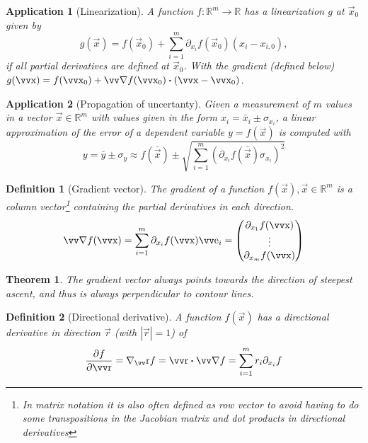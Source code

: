 \documentclass[twocolumn, margin=small]{tex/hsrzf}
\theoremstyle{fuvarzf}
\newtheorem{theorem}{Theorem}
\newtheorem{application}{Application}
\newtheorem{definition}{Definition}
\begin{document}
\begin{application}[Linearization]
  A function \(f: \mathbb{R}^m\to\mathbb{R}\) has a linearization \(g\) at
  \(\vec{x}_0\) given by
  \[
    g(\vec{x}) = f(\vec{x}_0) 
      + \sum_{i=1}^m \partial_{x_i} f(\vec{x}_0)(x_i - x_{i,0}) ,
  \]
  if all partial derivatives are defined at \(\vec{x}_0\). With the gradient
  (defined below) \(g(\vec{x}) = f(\vec{x}_0) + \grad f(\vec{x}_0) \dotp
  (\vec{x} - \vec{x}_0)\).
\end{application}

\begin{application}[Propagation of uncertanty]
  Given a measurement of \(m\) values in a vector \(\vec{x}\in\mathbb{R}^m\)
  with values given in the form \(x_i = \bar{x}_i \pm \sigma_{x_i}\), a linear
  approximation of the error of a dependent variable \(y = f(\vec{x})\) is
  computed with
  \[
    y = \bar{y} \pm \sigma_y \approx f(\bar{\vec{x}})
      \pm \sqrt{\sum_{i=1}^m \left(
        \partial_{x_i} f(\bar{\vec{x}}) \sigma_{x_i}\right)^2}
  \]
\end{application}

\begin{definition}[Gradient vector]
  The \emph{gradient} of a function \(f(\vec{x}), \vec{x}\in\mathbb{R}^m\) is a
  column vector\footnote{In matrix notation it is also often defined as row
  vector to avoid having to do some transpositions in the Jacobian matrix and
  dot products in directional derivatives} containing the partial derivatives
  in each direction.
  \[
    \grad f (\vec{x}) = \sum_{i=1}^m \partial_{x_i} f(\vec{x}) \vec{e}_i
      = \begin{pmatrix}
        \partial_{x_1} f(\vec{x}) \\
        \vdots \\
        \partial_{x_m} f(\vec{x}) \\
      \end{pmatrix}
  \]
\end{definition}

\begin{theorem}
  The gradient vector always points towards \emph{the direction of steepest
  ascent}, and thus is always perpendicular to contour lines.
\end{theorem}

\begin{definition}[Directional derivative]
  A function \(f(\vec{x})\) has a directional derivative in direction
  \(\vec{r}\) (with \(|\vec{r}|=1\)) of
  \[
    \frac{\partial f}{\partial\vec{r}} 
      = \nabla_\vec{r} f = \vec{r} \dotp \grad f
      = \sum_{i=1}^m r_i \partial_{x_i} f
  \]
\end{definition}
\end{document}
